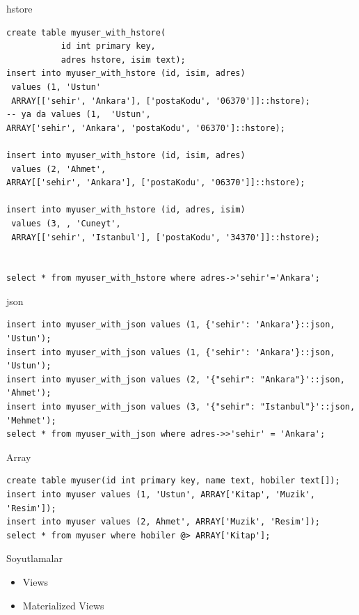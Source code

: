 \documentclass[presentation]{beamer}
\begin{document}
\begin{frame}[fragile,label=sec-25]{hstore}
 \begin{verbatim}
create table myuser_with_hstore(
           id int primary key,
           adres hstore, isim text);
insert into myuser_with_hstore (id, isim, adres)
 values (1, 'Ustun'
 ARRAY[['sehir', 'Ankara'], ['postaKodu', '06370']]::hstore);
-- ya da values (1,  'Ustun',
ARRAY['sehir', 'Ankara', 'postaKodu', '06370']::hstore);

insert into myuser_with_hstore (id, isim, adres)
 values (2, 'Ahmet',
ARRAY[['sehir', 'Ankara'], ['postaKodu', '06370']]::hstore);

insert into myuser_with_hstore (id, adres, isim)
 values (3, , 'Cuneyt',
 ARRAY[['sehir', 'Istanbul'], ['postaKodu', '34370']]::hstore);


select * from myuser_with_hstore where adres->'sehir'='Ankara';
\end{verbatim}
\end{frame}

\begin{frame}[fragile,label=sec-26]{json}
 \begin{verbatim}
insert into myuser_with_json values (1, {'sehir': 'Ankara'}::json, 'Ustun');
insert into myuser_with_json values (1, {'sehir': 'Ankara'}::json, 'Ustun');
insert into myuser_with_json values (2, '{"sehir": "Ankara"}'::json, 'Ahmet');
insert into myuser_with_json values (3, '{"sehir": "Istanbul"}'::json, 'Mehmet');
select * from myuser_with_json where adres->>'sehir' = 'Ankara';
\end{verbatim}
\end{frame}


\begin{frame}[fragile,label=sec-27]{Array}
 \begin{verbatim}
create table myuser(id int primary key, name text, hobiler text[]);
insert into myuser values (1, 'Ustun', ARRAY['Kitap', 'Muzik', 'Resim']);
insert into myuser values (2, Ahmet', ARRAY['Muzik', 'Resim']);
select * from myuser where hobiler @> ARRAY['Kitap'];
\end{verbatim}
\end{frame}

\begin{frame}[label=sec-28]{Soyutlamalar}
\begin{itemize}
\item Views
\item Materialized Views
\end{itemize}
\end{frame}
\end{document}
